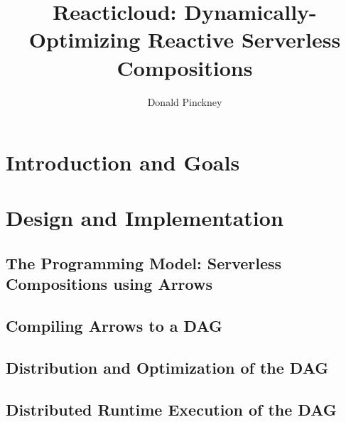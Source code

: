 \documentclass[10pt,sigplan,screen,nonacm]{acmart}
\begin{document}
\title{Reacticloud: Dynamically-Optimizing Reactive Serverless Compositions}


\author{Donald Pinckney}
\maketitle





\section{Introduction and Goals}

\section{Design and Implementation}
\subsection{The Programming Model: Serverless Compositions using Arrows}

\subsection{Compiling Arrows to a DAG}

\subsection{Distribution and Optimization of the DAG}

\subsection{Distributed Runtime Execution of the DAG}
\end{document}
